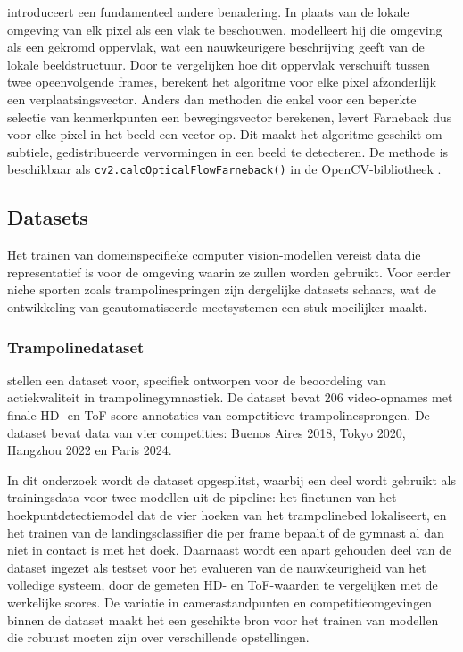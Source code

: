 \textcite{Farneback2003} introduceert een fundamenteel andere benadering. In plaats van de lokale omgeving van elk pixel als een vlak te beschouwen, modelleert hij die omgeving als een gekromd oppervlak, wat een nauwkeurigere beschrijving geeft van de lokale beeldstructuur. Door te vergelijken hoe dit oppervlak verschuift tussen twee opeenvolgende frames, berekent het algoritme voor elke pixel afzonderlijk een verplaatsingsvector. Anders dan methoden die enkel voor een beperkte selectie van kenmerkpunten een bewegingsvector berekenen, levert Farneback dus voor elke pixel in het beeld een vector op. Dit maakt het algoritme geschikt om subtiele, gedistribueerde vervormingen in een beeld te detecteren. De methode is beschikbaar als \texttt{cv2.calcOpticalFlowFarneback()} in de OpenCV-bibliotheek \autocite{opencv_library}.

\subsection{Datasets}
\label{sec:datasets}

Het trainen van domeinspecifieke computer vision-modellen vereist data die representatief is voor de omgeving waarin ze zullen worden gebruikt. Voor eerder niche sporten zoals trampolinespringen zijn dergelijke datasets schaars, wat de ontwikkeling van geautomatiseerde meetsystemen een stuk moeilijker maakt.

\subsubsection{Trampolinedataset}
\label{subsec:dataset-lin}

\textcite{Lin2025} stellen een dataset voor, specifiek ontworpen voor de beoordeling van actiekwaliteit in trampolinegymnastiek. De dataset bevat 206 video-opnames met finale HD- en ToF-score annotaties van competitieve trampolinesprongen. De dataset bevat data van vier competities: Buenos Aires 2018, Tokyo 2020, Hangzhou 2022 en Paris 2024.

In dit onderzoek wordt de dataset opgesplitst, waarbij een deel wordt gebruikt als trainingsdata voor twee modellen uit de pipeline: het finetunen van het hoekpuntdetectiemodel dat de vier hoeken van het trampolinebed lokaliseert, en het trainen van de landingsclassifier die per frame bepaalt of de gymnast al dan niet in contact is met het doek. Daarnaast wordt een apart gehouden deel van de dataset ingezet als testset voor het evalueren van de nauwkeurigheid van het volledige systeem, door de gemeten HD- en ToF-waarden te vergelijken met de werkelijke scores. De variatie in camerastandpunten en competitieomgevingen binnen de dataset maakt het een geschikte bron voor het trainen van modellen die robuust moeten zijn over verschillende opstellingen.